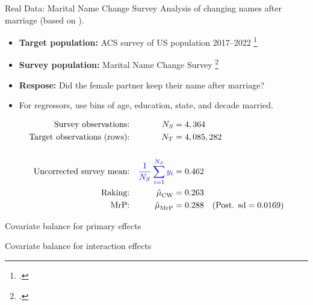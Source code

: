 

\begin{frame}{Real Data: Marital Name Change Survey}
Analysis of changing names after marriage (based on \textcite{alexander:2019:namechange}).

\begin{itemize}
    \item \textbf{Target population:} ACS survey of US population 2017--2022 \footcite{ipumsusa}
    \item \textbf{Survey population:} Marital Name Change Survey \footcite{cohen:2019:namechange}
    \item \textbf{Respose:}  Did the female partner keep their name after marriage?
    \item For regressors, use bins of age, education, state, and decade married.
\end{itemize}

$$
\begin{aligned}
    \textrm{Survey observations:} &&  {N_S} ={}& 4,364  \\
    \textrm{Target observations (rows):} &&  {N_T} ={}& 4,085,282 \\
    \\
    \textrm{Uncorrected survey mean:} && \textcolor{blue}{\frac{1}{{N_S}} \sum_{i=1}^{N_S} y_i} ={}& 0.462 \\
    \textrm{Raking:} && \hat{\mu}^{}_{\mathrm{CW}} ={}& 0.263 \\
    \textrm{MrP:} && \hat{\mu}^{}_{\mathrm{MrP}} ={}& 0.288
        \quad(\textrm{Post. sd} = 0.0169)\\
\end{aligned}
$$
%
\end{frame}




\begin{frame}{Covariate balance for primary effects}
\AlexanderImbalancePrimary{}
\end{frame}


\begin{frame}{Covariate balance for interaction effects}
\AlexanderImbalanceInteraction{}
\end{frame}




